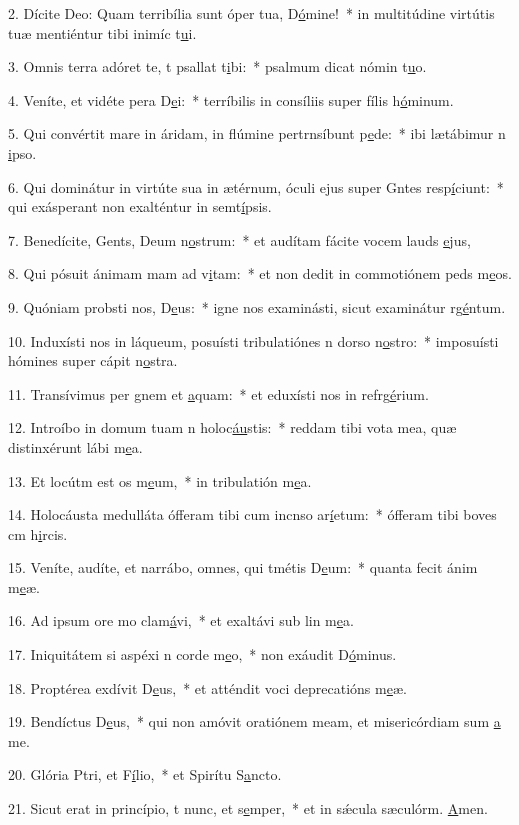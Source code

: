 2. Dícite Deo: Quam terribília sunt óper tua, D\uline{ó}mine!~* in multitúdine virtútis tuæ mentiéntur tibi inimíc t\uline{u}i.\par 
3. Omnis terra adóret te, t psallat t\uline{i}bi:~* psalmum dicat nómin t\uline{u}o.\par 
4. Veníte, et vidéte pera D\uline{e}i:~* terríbilis in consíliis super fílis h\uline{ó}minum.\par 
5. Qui convértit mare in áridam, in flúmine pertrnsíbunt p\uline{e}de:~* ibi lætábimur n \uline{i}pso.\par 
6. Qui dominátur in virtúte sua in ætérnum, óculi ejus super Gntes resp\uline{í}ciunt:~* qui exásperant non exalténtur in semt\uline{í}psis.\par 
7. Benedícite, Gents, Deum n\uline{o}strum:~* et audítam fácite vocem lauds \uline{e}jus,\par 
8. Qui pósuit ánimam mam ad v\uline{i}tam:~* et non dedit in commotiónem peds m\uline{e}os.\par 
9. Quóniam probsti nos, D\uline{e}us:~* igne nos examinásti, sicut examinátur rg\uline{é}ntum.\par 
10. Induxísti nos in láqueum, posuísti tribulatiónes n dorso n\uline{o}stro:~* imposuísti hómines super cápit n\uline{o}stra.\par 
11. Transívimus per gnem et \uline{a}quam:~* et eduxísti nos in refrg\uline{é}rium.\par 
12. Introíbo in domum tuam n holoc\uline{áu}stis:~* reddam tibi vota mea, quæ distinxérunt lábi m\uline{e}a.\par 
13. Et locútm est os m\uline{e}um,~* in tribulatión m\uline{e}a.\par 
14. Holocáusta medulláta ófferam tibi cum incnso ar\uline{í}etum:~* ófferam tibi boves cm h\uline{i}rcis.\par 
15. Veníte, audíte, et narrábo, omnes, qui tmétis D\uline{e}um:~* quanta fecit ánim m\uline{e}æ.\par 
16. Ad ipsum ore mo clam\uline{á}vi,~* et exaltávi sub lin m\uline{e}a.\par 
17. Iniquitátem si aspéxi n corde m\uline{e}o,~* non exáudit D\uline{ó}minus.\par 
18. Proptérea exdívit D\uline{e}us,~* et atténdit voci deprecatións m\uline{e}æ.\par 
19. Bendíctus D\uline{e}us,~* qui non amóvit oratiónem meam, et misericórdiam sum \uline{a} me.\par 
20. Glória Ptri, et F\uline{í}lio,~* et Spirítu S\uline{a}ncto.\par 
21. Sicut erat in princípio, t nunc, et s\uline{e}mper,~* et in sǽcula sæculórm. \uline{A}men.\par 
